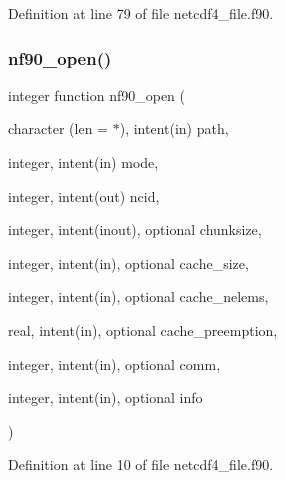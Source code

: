 Definition at line 79 of file netcdf4\+\_\+file.\+f90.

\mbox{\label{netcdf4__file_8f90_a67a79f214ac9e0f8f2080984f0dee6fe}} 
\subsubsection{\texorpdfstring{nf90\+\_\+open()}{nf90\_open()}}
{\footnotesize\ttfamily integer function nf90\+\_\+open (\begin{DoxyParamCaption}\item[{character (len = $\ast$), intent(in)}]{path,  }\item[{integer, intent(in)}]{mode,  }\item[{integer, intent(out)}]{ncid,  }\item[{integer, intent(inout), optional}]{chunksize,  }\item[{integer, intent(in), optional}]{cache\+\_\+size,  }\item[{integer, intent(in), optional}]{cache\+\_\+nelems,  }\item[{real, intent(in), optional}]{cache\+\_\+preemption,  }\item[{integer, intent(in), optional}]{comm,  }\item[{integer, intent(in), optional}]{info }\end{DoxyParamCaption})}



Definition at line 10 of file netcdf4\+\_\+file.\+f90.

